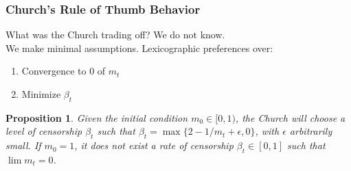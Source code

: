 \documentclass[aspectratio=169,red,12pt]{beamer}
\newtheorem{proposition}{Proposition}
\begin{document}
\begin{frame}
	\frametitle{Church's Rule of Thumb Behavior}
What was the Church trading off? We do not know.\\ 
 We make minimal assumptions. Lexicographic preferences over:\vspace{0.3cm}
 
 \begin{enumerate}
 	\item Convergence to 0 of $m_t$\\ \vspace{0.1cm}
 	\item Minimize $\beta_t$ \\ \vspace{0.3cm}
 \end{enumerate}

\begin{proposition}
	Given the initial condition $m_0 \in [0,1)$, the Church will choose a level of censorship $\beta_t$ such that $\beta_t=\max\{2-1/m_t+\epsilon,0\}$, with $\epsilon$ arbitrarily small. If $m_0=1$, it does not exist a rate of censorship $\beta_t \in [0,1]$ such that $\lim m_t=0$.
	\label{proposition:rthumb}
\end{proposition}
\end{frame}
\end{document}
